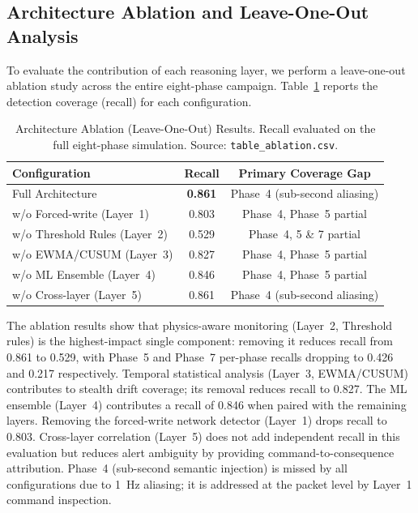 \documentclass[journal,twoside,web]{ieeecolor}
\begin{document}
\subsection{Architecture Ablation and Leave-One-Out Analysis}
To evaluate the contribution of each reasoning layer, we perform a leave-one-out ablation study across the entire eight-phase campaign. Table~\ref{tab:ablation_results} reports the detection coverage (recall) for each configuration.
\begin{table}[!t]
\caption{Architecture Ablation (Leave-One-Out) Results. Recall evaluated on the full eight-phase simulation. Source: \texttt{table\_ablation.csv}.}
\label{tab:ablation_results}
\centering
\setlength{\tabcolsep}{5pt}
\begin{tabular}{lcc}
\toprule
Configuration & Recall & Primary Coverage Gap \\
\midrule
Full Architecture & \textbf{0.861} & Phase~4 (sub-second aliasing) \\
w/o Forced-write (Layer~1) & 0.803 & Phase~4, Phase~5 partial \\
w/o Threshold Rules (Layer~2) & 0.529 & Phase~4, 5 \& 7 partial \\
w/o EWMA/CUSUM (Layer~3) & 0.827 & Phase~4, Phase~5 partial \\
w/o ML Ensemble (Layer~4) & 0.846 & Phase~4, Phase~5 partial \\
w/o Cross-layer (Layer~5) & 0.861 & Phase~4 (sub-second aliasing) \\
\bottomrule
\end{tabular}
\end{table}

The ablation results show that physics-aware monitoring (Layer~2, Threshold rules) is the highest-impact single component: removing it reduces recall from 0.861 to 0.529, with Phase~5 and Phase~7 per-phase recalls dropping to 0.426 and 0.217 respectively. Temporal statistical analysis (Layer~3, EWMA/CUSUM) contributes to stealth drift coverage; its removal reduces recall to 0.827. The ML ensemble (Layer~4) contributes a recall of 0.846 when paired with the remaining layers. Removing the forced-write network detector (Layer~1) drops recall to 0.803. Cross-layer correlation (Layer~5) does not add independent recall in this evaluation but reduces alert ambiguity by providing command-to-consequence attribution. Phase~4 (sub-second semantic injection) is missed by all configurations due to 1~Hz aliasing; it is addressed at the packet level by Layer~1 command inspection.
\end{document}
